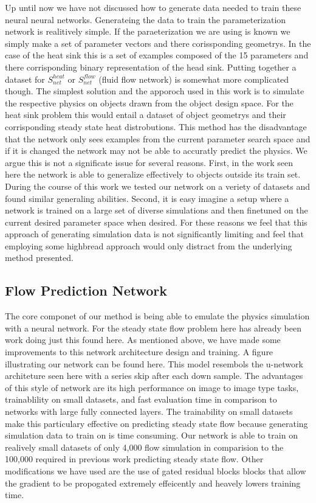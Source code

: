 \documentclass{article} %
\begin{document}
Up until now we have not discussed how to generate data needed to train these neural neural networks. Generateing the data to train the parameterization network is realitively simple. If the paraeterization we are using is known we simply make a set of parameter vectors and there corissponding geometrys. In the case of the heat sink this is a set of examples composed of the 15 parameters and there corrisponding binary representation of the head sink. Putting together a dataset for $S^{heat}_{net}$ or $S^{flow}_{net}$ (fluid flow network) is somewhat more complicated though. The simplest solution and the apporoch used in this work is to simulate the respective physics on objects drawn from the object design space. For the heat sink problem this would entail a dataset of object geometrys and their corrisponding steady state heat distrobutions. This method has the disadvantage that the network only sees examples from the current parameter search space and if it is changed the network may not be able to accuratly predict the physics. We argue this is not a significate issue for several reasons. First, in the work seen here the network is able to generalize effectively to objects outside its train set. During the course of this work we tested our network on a veriety of datasets and found similar generaling abilities. Second, it is easy imagine a setup where a network is trained on a large set of diverse simulations and then finetuned on the current desired parameter space when desired. For these reasons we feel that this approach of generating simulation data is not significantly limiting and feel that employing some highbread approach would only distract from the underlying method presented.

\subsection{Flow Prediction Network}

The core componet of our method is being able to emulate the physics simulation with a neural network. For the steady state flow problem here has already been work doing just this found here. As mentioned above, we have made some improvements to this network architecture design and training. A figure illustrating our network can be found here. This model resembols the u-network architeture seen here with a series skip after each down sample. The advantages of this style of network are its high performance on image to image type tasks, trainablility on small datasets, and fast evaluation time in comparison to networks with large fully connected layers. The trainability on small datasets make this particulary effective on predicting steady state flow because generating simulation data to train on is time consuming. Our network is able to train on realively small datasets of only 4,000 flow simulation in comparision to the 100,000 required in previous work predicting steady state flow. Other modifications we have used are the use of gated residual blocks blocks that allow the gradient to be propogated extremely effeicently and heavely lowers training time.
\end{document}
